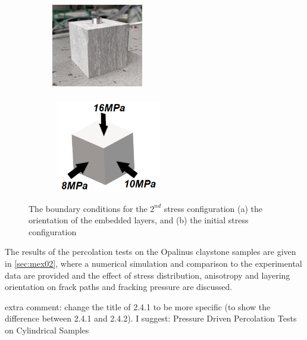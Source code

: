 \begin{figure}[!ht]
\begin{subfigure}[c]{0.48\textwidth}
\includegraphics[width=4cm,height=4cm]{figures/Amir_Percolation_Orientation2.png}
\subcaption{}
\label{fig:Amir_Percolation_Orientation2}
\end{subfigure}
\hfill
\begin{subfigure}[c]{0.48\textwidth}
\includegraphics[width=5cm,height=4cm]{figures/Amir_Percolation_Stress_2.png}
\subcaption{}
\label{fig:Amir_Percolation_Stress_2}
\end{subfigure}
\caption{The boundary conditions for the $2^{nd}$ stress configuration  (a) the orientation of the embedded layers, and (b) the initial stress configuration}
\end{figure}

The results of the percolation tests on the Opalinus claystone samples are given in \ref{sec:mex02}, where a numerical simulation and comparison to the experimental data are provided and the effect of stress distribution, anisotropy and layering orientation on frack paths and fracking pressure are discussed. 

extra comment: change the title of 2.4.1 to be more specific (to show the difference between 2.4.1 and 2.4.2). I suggest: Pressure Driven Percolation Tests on Cylindrical Samples
